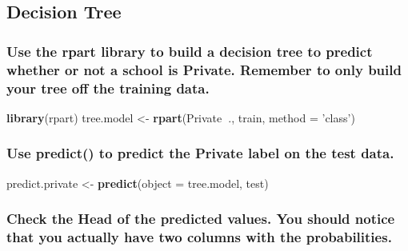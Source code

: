 \documentclass[]{article}
\newenvironment{Shaded}{\begin{snugshade}}{\end{snugshade}}
\newcommand{\DataTypeTok}[1]{\textcolor[rgb]{0.13,0.29,0.53}{#1}}
\newcommand{\KeywordTok}[1]{\textcolor[rgb]{0.13,0.29,0.53}{\textbf{#1}}}
\newcommand{\NormalTok}[1]{#1}
\newcommand{\OperatorTok}[1]{\textcolor[rgb]{0.81,0.36,0.00}{\textbf{#1}}}
\newcommand{\StringTok}[1]{\textcolor[rgb]{0.31,0.60,0.02}{#1}}
\begin{document}
\hypertarget{decision-tree}{%
\subsection{Decision Tree}\label{decision-tree}}

\hypertarget{use-the-rpart-library-to-build-a-decision-tree-to-predict-whether-or-not-a-school-is-private.-remember-to-only-build-your-tree-off-the-training-data.}{%
\subsubsection{Use the rpart library to build a decision tree to predict
whether or not a school is Private. Remember to only build your tree off
the training
data.}\label{use-the-rpart-library-to-build-a-decision-tree-to-predict-whether-or-not-a-school-is-private.-remember-to-only-build-your-tree-off-the-training-data.}}

\begin{Shaded}
\begin{Highlighting}[]
\KeywordTok{library}\NormalTok{(rpart)}
\NormalTok{tree.model <-}\StringTok{ }\KeywordTok{rpart}\NormalTok{(Private}\OperatorTok{~}\NormalTok{., train, }\DataTypeTok{method =} \StringTok{'class'}\NormalTok{)}
\end{Highlighting}
\end{Shaded}

\hypertarget{use-predict-to-predict-the-private-label-on-the-test-data.}{%
\subsubsection{Use predict() to predict the Private label on the test
data.}\label{use-predict-to-predict-the-private-label-on-the-test-data.}}

\begin{Shaded}
\begin{Highlighting}[]
\NormalTok{predict.private <-}\StringTok{ }\KeywordTok{predict}\NormalTok{(}\DataTypeTok{object =}\NormalTok{ tree.model, test)}
\end{Highlighting}
\end{Shaded}

\hypertarget{check-the-head-of-the-predicted-values.-you-should-notice-that-you-actually-have-two-columns-with-the-probabilities.}{%
\subsubsection{Check the Head of the predicted values. You should notice
that you actually have two columns with the
probabilities.}\label{check-the-head-of-the-predicted-values.-you-should-notice-that-you-actually-have-two-columns-with-the-probabilities.}}
\end{document}
